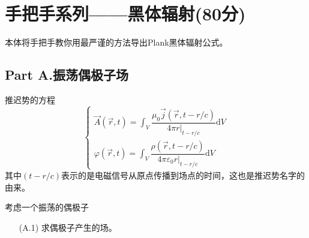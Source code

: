 \documentclass{article}
\begin{document}
\everymath{\displaystyle}
\section*{手把手系列——黑体辐射(80分)}
本体将手把手教你用最严谨的方法导出Plank黑体辐射公式。
\subsection*{Part A.振荡偶极子场}
推迟势的方程
$$
\begin{cases}
    \vec{A}(\vec{r},t)=\int_{V}^{}\dfrac{\mu_0\vec{j}(\vec{r},t-r/c)}{4\pi r|_{t-r/c}}\mathrm{d}V\\
    \varphi(\vec{r},t)=\int_{V}^{}\dfrac{\rho(\vec{r},t-r/c)}{4\pi \varepsilon_0 r|_{t-r/c}}\mathrm{d}V
\end{cases}
$$
其中$(t-r/c)$表示的是电磁信号从原点传播到场点的时间，这也是推迟势名字的由来。\par
考虑一个振荡的偶极子
\begin{itemize}
\item[(A.1)]求偶极子产生的场。
\end{itemize}
\end{document}
